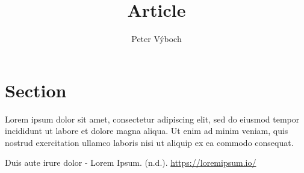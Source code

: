 \documentclass[11pt]{article}
\title{Article}
\author{Peter Výboch}
\begin{document}
\maketitle

\section{Section}

Lorem ipsum dolor sit amet, consectetur adipiscing elit, sed do eiusmod tempor incididunt ut labore et dolore magna aliqua. Ut enim ad minim veniam, quis nostrud exercitation ullamco laboris nisi ut aliquip ex ea commodo consequat.

\begin{thebibliography}{1}

 Duis aute irure dolor - Lorem Ipsum. (n.d.). \url{https://loremipsum.io/}

\end{thebibliography}
\end{document}
